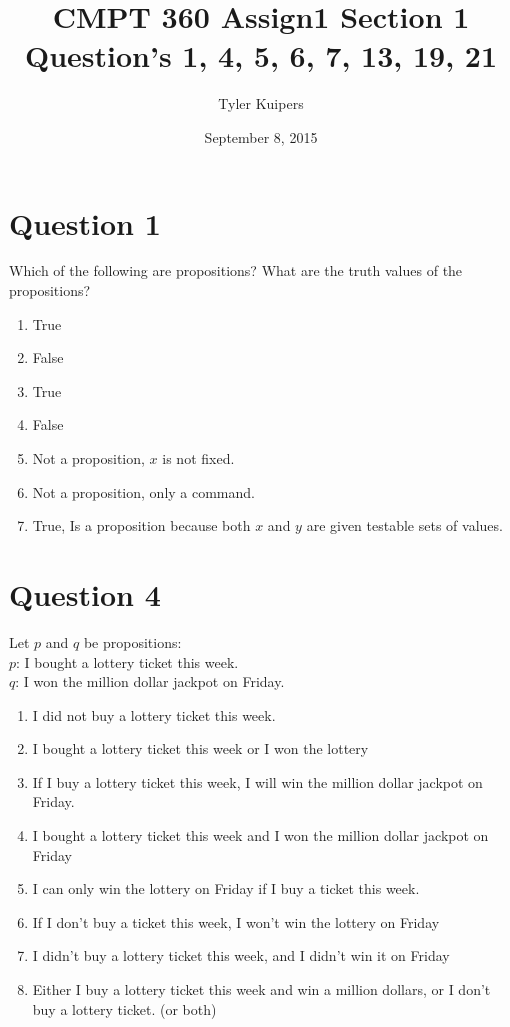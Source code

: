 \documentclass[12pt]{extarticle}
\title{CMPT 360 Assign1 Section 1\\ Question's 1, 4, 5, 6, 7, 13, 19, 21}
\author{Tyler Kuipers}
\date{September 8, 2015}
\begin{document}
\maketitle
\section*{Question 1}
	Which of the following are propositions? 
	What are the truth values of the propositions?
	\begin{enumerate}
		\item True
		\item False
		\item True
		\item False
		\item Not a proposition, $x$ is not fixed.
		\item Not a proposition, only a command.
		\item True, Is a proposition because both $x$ and $y$ are given testable sets of values.
	\end{enumerate}

\section*{Question 4}
	Let $p$ and $q$ be propositions:\\
		\hspace*{2cm}$p$: I bought a lottery ticket this week.\\
		\hspace*{2cm}$q$: I won the million dollar jackpot on Friday.\\
	\begin{enumerate}
		\item I did not buy a lottery ticket this week.
		\item I bought a lottery ticket this week or I won the lottery
		\item If I buy a lottery ticket this week, I will win the million dollar jackpot on Friday.
		\item I bought a lottery ticket this week and I won the million dollar jackpot on Friday
		\item I can only win the lottery on Friday if I buy a ticket this week.
		\item If I don't buy a ticket this week, I won't win the lottery on Friday
		\item I didn't buy a lottery ticket this week, and I didn't win it on Friday
		\item Either I buy a lottery ticket this week and win a million dollars, or I don't buy a lottery ticket. (or both)
	\end{enumerate}
\end{document}
